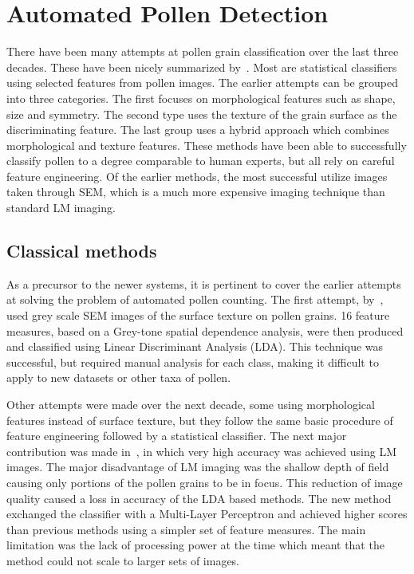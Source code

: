 \section{Automated Pollen Detection}\label{sec:rel-pollen}
There have been many attempts at pollen grain classification over the last three decades.
These have been nicely summarized by\ \textcite{sevillano_improving_2018}.
Most are statistical classifiers using selected features from pollen images.
The earlier attempts can be grouped into three categories.
The first focuses on morphological features such as shape, size and symmetry.
The second type uses the texture of the grain surface as the discriminating feature.
The last group uses a hybrid approach which combines morphological and texture features.
These methods have been able to successfully classify pollen to a degree comparable to human experts, but all rely on careful feature engineering.
Of the earlier methods, the most successful utilize images taken through SEM, which is a much more expensive imaging technique than standard LM imaging.

\subsection{Classical methods}
As a precursor to the newer systems, it is pertinent to cover the earlier attempts at solving the problem of automated pollen counting.
The first attempt, by\ \textcite{langford_computerized_1990}, used grey scale SEM images of the surface texture on pollen grains.
16 feature measures, based on a Grey-tone spatial dependence analysis, were then produced and classified using Linear Discriminant Analysis (LDA).
This technique was successful, but required manual analysis for each class, making it difficult to apply to new datasets or other taxa of pollen.

Other attempts were made over the next decade, some using morphological features instead of surface texture, but they follow the same basic procedure of feature engineering followed by a statistical classifier.
The next major contribution was made in\ \textcite{li_pollen_1999}, in which very high accuracy was achieved using LM images.
The major disadvantage of LM imaging was the shallow depth of field causing only portions of the pollen grains to be in focus.
This reduction of image quality caused a loss in accuracy of the LDA based methods.
The new method exchanged the classifier with a Multi-Layer Perceptron and achieved higher scores than previous methods using a simpler set of feature measures.
The main limitation was the lack of processing power at the time which meant that the method could not scale to larger sets of images.

